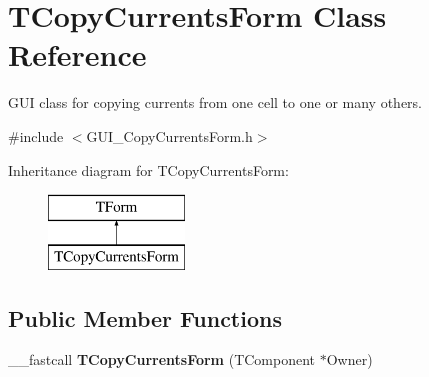 \hypertarget{class_t_copy_currents_form}{\section{T\+Copy\+Currents\+Form Class Reference}
\label{class_t_copy_currents_form}
}


G\+U\+I class for copying currents from one cell to one or many others.  




{\ttfamily \#include $<$G\+U\+I\+\_\+\+Copy\+Currents\+Form.\+h$>$}

Inheritance diagram for T\+Copy\+Currents\+Form\+:\begin{figure}[H]
\begin{center}
\leavevmode
\includegraphics[height=2.000000cm]{class_t_copy_currents_form}
\end{center}
\end{figure}
\subsection*{Public Member Functions}
\begin{DoxyCompactItemize}
\item 
\hypertarget{class_t_copy_currents_form_a1149e37ecf8669f6988ce052ee9b37ea}{\+\_\+\+\_\+fastcall {\bfseries T\+Copy\+Currents\+Form} (T\+Component $\ast$Owner)}\label{class_t_copy_currents_form_a1149e37ecf8669f6988ce052ee9b37ea}

\end{DoxyCompactItemize}
